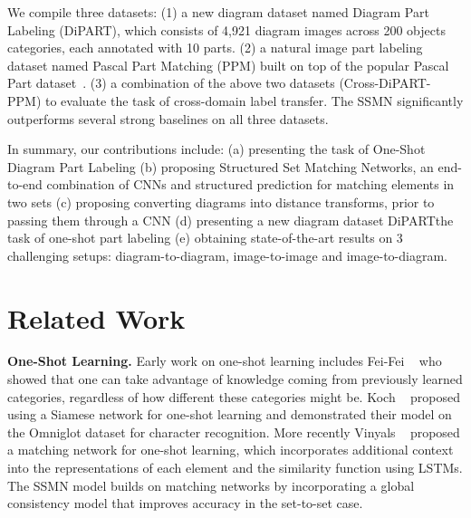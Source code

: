 \documentclass[10pt,twocolumn,letterpaper]{article}
\newcommand{\dataset}{\mbox{DiPART}}
\begin{document}
We compile three datasets: (1) a new diagram dataset named Diagram Part Labeling (\dataset), which consists of 4,921 diagram images across 200 objects categories, each annotated with 10 parts. (2) a natural image part labeling dataset named Pascal Part Matching (PPM) built on top of the popular Pascal Part dataset~\cite{chenMLFUY14}. (3) a combination of the above two datasets (Cross-DiPART-PPM) to evaluate the task of cross-domain label transfer. The SSMN significantly outperforms several strong baselines on all three datasets. 

In summary, our contributions include: (a) presenting the task of One-Shot Diagram Part Labeling (b) proposing Structured Set Matching Networks, an end-to-end combination of CNNs and structured prediction for matching elements in two sets (c) proposing converting diagrams into distance transforms, prior to passing them through a CNN (d) presenting a new diagram dataset \dataset\towards the task of one-shot part labeling (e) obtaining state-of-the-art results on 3 challenging setups: diagram-to-diagram, image-to-image and image-to-diagram.


\section{Related Work}
\label{sec:background}
\noindent\textbf{One-Shot Learning.}
Early work on one-shot learning includes Fei-Fei \etal~\cite{FeiFei2003ABA, FeiFei2006OneshotLO} who showed that one can take advantage of knowledge coming from previously learned categories, regardless of how different these categories might be. Koch \etal~\cite{Koch2015SiameseNN} proposed using a Siamese network for one-shot learning and demonstrated their model on the Omniglot dataset for character recognition. More recently Vinyals \etal~\cite{vinyalsBLKW16} proposed a matching network for one-shot learning, which incorporates additional context into the representations of each element and the similarity function using LSTMs. The SSMN model builds on matching networks by incorporating a global consistency model that improves accuracy in the set-to-set case.
\end{document}
